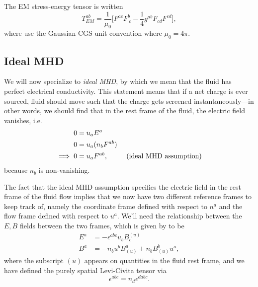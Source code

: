\documentclass[12pt]{article}
\numberwithin{equation}{section}
\begin{document}
The EM stress-energy tensor is written
\begin{equation}
T^{ab}_{EM} = \frac{1}{\mu_0} \Big[ F^{a c} F^{b}_{~c} - \frac{1}{4} g^{ab} F_{cd} F^{cd} \Big],
\end{equation}
where \cite{BaumgarteShapiro,Deppe22} use the Gaussian-CGS unit convention where $\mu_0 = 4 \pi$.

\subsection{Ideal MHD}

We will now specialize to \textit{ideal MHD}, by which we mean that the fluid has perfect electrical conductivity.
This statement means that if a net charge is ever sourced, fluid should move such that the charge gets screened instantaneously---in other words, we should find that in the rest frame of the fluid, the electric field vanishes, i.e. 
\begin{equation}
\begin{aligned}
0 &= u_a E^{a} \\
0 &= u_a (n_b F^{ab}) \\
\implies 0 &= u_{a} F^{ab}, ~~~~~~~~\textnormal{(ideal MHD assumption)}
\end{aligned}
\end{equation}
because $n_b$ is non-vanishing.

The fact that the ideal MHD assumption specifies the electric field in the rest frame of the fluid flow implies that we now have two different reference frames to keep track of, namely the coordinate frame defined with respect to $n^a$ and the flow frame defined with respect to $u^a$.
We'll need the relationship between the $E, B$ fields between the two frames, which is given by \cite{BaumgarteShapiro} to be
\begin{align}
E^{a} &= -\epsilon^{abc} u_b B^{(u)}_{c} \\
B^{a} &= -n_b u^b B^{a}_{(u)} + n_b B^{b}_{(u)} u^a,
\end{align}
where the subscript $(u)$ appears on quantities in the fluid rest frame, and we have defined the purely spatial Levi-Civita tensor via
\begin{equation}
\epsilon^{abc} = n_d \epsilon^{dabc}.
\end{equation}
\end{document}
